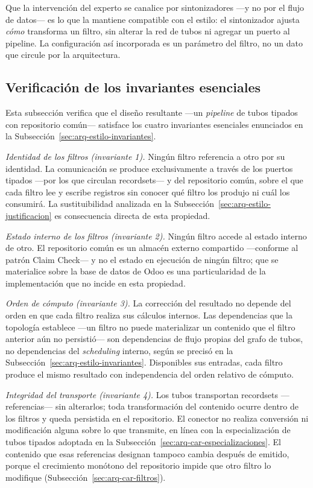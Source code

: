 \documentclass[12pt]{report}
\begin{document}
Que la intervención del experto se canalice por sintonizadores ---y no por el flujo de datos--- es lo que la mantiene compatible con el estilo: el sintonizador ajusta \textit{cómo} transforma un filtro, sin alterar la red de tubos ni agregar un puerto al pipeline. La configuración así incorporada es un parámetro del filtro, no un dato que circule por la arquitectura.

\subsection{Verificación de los invariantes esenciales}
\label{sec:arq-car-verificacion}

Esta subsección verifica que el diseño resultante ---un \textit{pipeline} de tubos tipados con repositorio común--- satisface los cuatro invariantes esenciales enunciados en la Subsección~\ref{sec:arq-estilo-invariantes}.

\textit{Identidad de los filtros (invariante 1).} Ningún filtro referencia a otro por su identidad. La comunicación se produce exclusivamente a través de los puertos tipados ---por los que circulan recordsets--- y del repositorio común, sobre el que cada filtro lee y escribe registros sin conocer qué filtro los produjo ni cuál los consumirá. La sustituibilidad analizada en la Subsección~\ref{sec:arq-estilo-justificacion} es consecuencia directa de esta propiedad.

\textit{Estado interno de los filtros (invariante 2).} Ningún filtro accede al estado interno de otro. El repositorio común es un almacén externo compartido ---conforme al patrón Claim Check--- y no el estado en ejecución de ningún filtro; que se materialice sobre la base de datos de Odoo es una particularidad de la implementación que no incide en esta propiedad.

\textit{Orden de cómputo (invariante 3).} La corrección del resultado no depende del orden en que cada filtro realiza sus cálculos internos. Las dependencias que la topología establece ---un filtro no puede materializar un contenido que el filtro anterior aún no persistió--- son dependencias de flujo propias del grafo de tubos, no dependencias del \textit{scheduling} interno, según se precisó en la Subsección~\ref{sec:arq-estilo-invariantes}. Disponibles sus entradas, cada filtro produce el mismo resultado con independencia del orden relativo de cómputo.

\textit{Integridad del transporte (invariante 4).} Los tubos transportan recordsets ---referencias--- sin alterarlos; toda transformación del contenido ocurre dentro de los filtros y queda persistida en el repositorio. El conector no realiza conversión ni modificación alguna sobre lo que transmite, en línea con la especialización de tubos tipados adoptada en la Subsección~\ref{sec:arq-car-especializaciones}. El contenido que esas referencias designan tampoco cambia después de emitido, porque el crecimiento monótono del repositorio impide que otro filtro lo modifique (Subsección~\ref{sec:arq-car-filtros}).
\end{document}
